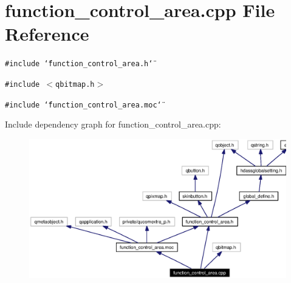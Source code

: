 \section{function\_\-control\_\-area.cpp File Reference}
\label{function__control__area_8cpp}


{\tt \#include \char`\"{}function\_\-control\_\-area.h\char`\"{}}\par
{\tt \#include $<$qbitmap.h$>$}\par
{\tt \#include \char`\"{}function\_\-control\_\-area.moc\char`\"{}}\par


Include dependency graph for function\_\-control\_\-area.cpp:\begin{figure}[H]
\begin{center}
\leavevmode
\includegraphics[width=317pt]{function__control__area_8cpp__incl}
\end{center}
\end{figure}
